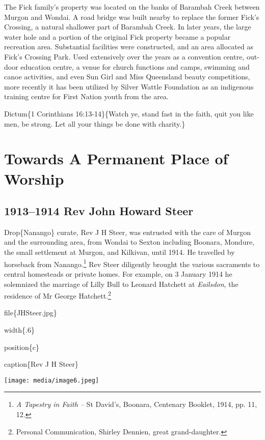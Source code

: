 The Fick family's property was located on the banks of Barambah Creek between Murgon and Wondai. A road bridge was built nearby to replace the former Fick's Crossing\emph{,} a natural shallower part of Barambah Creek. In later years, the large water hole and a portion of the original Fick property became a popular recreation area. Substantial facilities were constructed, and an area allocated as Fick's Crossing Park\emph{.} Used extensively over the years as a convention centre, out-door education centre, a venue for church functions and camps, swimming and canoe activities, and even Sun Girl and Miss Queensland beauty competitions, more recently it has been utilized by Silver Wattle Foundation as an indigenous training centre for First Nation youth from the area.

Dictum\{1 Corinthians 16:13-14\}\{Watch ye, stand fast in the faith, quit you like men, be strong. Let all your things be done with charity.\}

\hypertarget{towards-a-permanent-place-of-worship}{%
\chapter{Towards A Permanent Place of Worship}\label{towards-a-permanent-place-of-worship}}

\hypertarget{rev-john-howard-steer}{%
\section{1913--1914 Rev John Howard Steer}\label{rev-john-howard-steer}}

Drop\{Nanango\} curate, Rev J H Steer, was entrusted with the care of Murgon and the surrounding area, from Wondai to Sexton including Boonara, Mondure, the small settlement at Murgon, and Kilkivan, until 1914. He travelled by horseback from Nanango.\footnote{\emph{A Tapestry in Faith --} St David's, Boonara, Centenary Booklet, 1914, pp. 11, 12.} Rev Steer diligently brought the various sacraments to central homesteads or private homes. For example, on 3 January 1914 he solemnized the marriage of Lilly Bull to Leonard Hatchett at \emph{Eailsdon}, the residence of Mr George Hatchett.\footnote{Personal Communication, Shirley Dennien, great grand-daughter.}

file\{JHSteer.jpg\}

width\{.6\}

position\{c\}

caption\{Rev J H Steer\}

\texttt{[image: media/image6.jpeg]}


